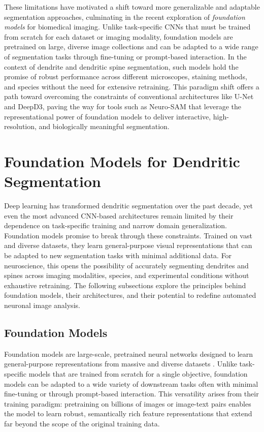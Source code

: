 These limitations have motivated a shift toward more generalizable and adaptable segmentation approaches, culminating in the recent exploration of \textit{foundation models} for biomedical imaging. Unlike task-specific \gls{CNN}s that must be trained from scratch for each dataset or imaging modality, foundation models are pretrained on large, diverse image collections and can be adapted to a wide range of segmentation tasks through fine-tuning or prompt-based interaction. In the context of dendrite and dendritic spine segmentation, such models hold the promise of robust performance across different microscopes, staining methods, and species without the need for extensive retraining. This paradigm shift offers a path toward overcoming the constraints of conventional architectures like U-Net and \gls{DeepD3}, paving the way for tools such as Neuro-\gls{SAM} that leverage the representational power of foundation models to deliver interactive, high-resolution, and biologically meaningful segmentation.

\section{Foundation Models for Dendritic Segmentation}
Deep learning has transformed dendritic segmentation over the past decade, yet even the most advanced \gls{CNN}-based architectures remain limited by their dependence on task-specific training and narrow domain generalization. Foundation models promise to break through these constraints. Trained on vast and diverse datasets, they learn general-purpose visual representations that can be adapted to new segmentation tasks with minimal additional data. For neuroscience, this opens the possibility of accurately segmenting dendrites and spines across imaging modalities, species, and experimental conditions without exhaustive retraining. The following subsections explore the principles behind foundation models, their architectures, and their potential to redefine automated neuronal image analysis.

\subsection{Foundation Models}
Foundation models are large-scale, pretrained neural networks designed to learn general-purpose representations from massive and diverse datasets \cite{Bommasani_2021}. Unlike task-specific models that are trained from scratch for a single objective, foundation models can be adapted to a wide variety of downstream tasks often with minimal fine-tuning or through prompt-based interaction. This versatility arises from their training paradigm: pretraining on billions of images or image-text pairs enables the model to learn robust, semantically rich feature representations that extend far beyond the scope of the original training data.


